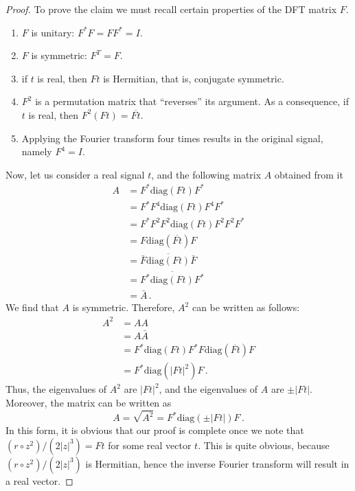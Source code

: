 \begin{proof}[Proof]
  To prove the claim we must recall certain properties of the DFT
  matrix $F$.
  \begin{enumerate}
  \item $F$ is unitary: $F^{*}F = FF^{*}=I$.
  \item $F$ is symmetric: $F^{T}=F$.
  \item if $t$ is real, then $Ft$ is Hermitian, that is, conjugate symmetric.
  \item $F^{2}$ is a permutation matrix that ``reverses'' its
    argument. As a consequence, if $t$ is real, then
    $F^{2}(Ft)=\overline{Ft}$.
  \item Applying the Fourier transform four times results in the
    original signal, namely $F^{4}=I$. 
  \end{enumerate}
  Now, let us consider a real signal $t$, and the following matrix $A$
  obtained from it
  \begin{equation}
    \label{eq:89}
    \begin{split}
      A
      & = F^{*} \mathrm{diag}(Ft) F^{*}\\
      & = F^{*} F^4 \mathrm{diag}(Ft) F^{4} F^{*}\\
      & = F^{*} F^{2} F^{2} \mathrm{diag}(Ft)F^{2} F^{2} F^{*} \\
      & = F \mathrm{diag}(\overline{Ft})F\\
      & = \overline{\bar{F} \mathrm{diag}(Ft) \bar{F}}\\
      & = \overline{F^{*} \mathrm{diag}(Ft) F^{*}}\\
      & = \bar{A} \,. 
    \end{split}
  \end{equation}
  We find that  $A$ is symmetric. Therefore,  $A^{2}$ can be written
  as follows:
  \begin{equation}
    \label{eq:90}
    \begin{split}
      A^{2}
      & = AA\\
      & = A \bar A \\
      & = F^{*} \mathrm{diag}(Ft) F^{*}  F
      \mathrm{diag}(\overline{Ft})F\\
      & = F^{*} \mathrm{diag} (|Ft|^{2}) F \,. 
    \end{split}
  \end{equation}
  Thus, the eigenvalues of $A^{2}$ are $|Ft|^{2}$, and the
  eigenvalues of $A$ are $\pm|Ft|$. Moreover, the matrix can be written
  as
  \begin{equation}
    \label{eq:91}
    A = \sqrt{A^{2}} = F^{*} \mathrm{diag} (\pm|Ft|) F \,.  
  \end{equation}
  In this form, it is obvious that our proof is complete once we note
  that $(r\circ z^{2})/(2|z|^{3})=Ft$ for some real vector $t$. This is
  quite obvious, because $(r\circ z^{2})/(2|z|^{3})$ is Hermitian, hence
  the inverse Fourier transform will result in a real vector.
\end{proof}

